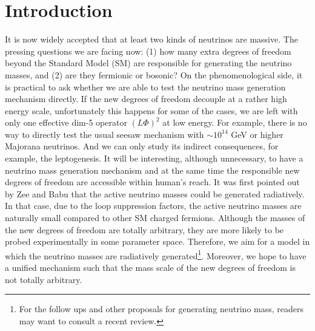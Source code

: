 \documentclass[aps,prd,preprint,nofootinbib]{revtex4}
\begin{document}
\section{Introduction}
It is now widely accepted that at least two kinds of neutrinos are
massive\cite{PDG}. The pressing questions we are facing now: (1)  how many extra degrees
of freedom beyond the Standard Model (SM) are responsible for
generating the neutrino masses, and (2) are they fermionic or bosonic?
On the phenomenological side, it is practical to ask whether we
are able to test the neutrino mass generation mechanism directly.
If the new degrees of freedom decouple at a rather high energy
scale, unfortunately this happens for some of the cases,  we are
left with only one effective dim-5 operator $(L \Phi)^2$ at  low
energy. For example, there is no way to directly test the usual
seesaw mechanism\cite{seesaw} with $\sim 10^{14}$ GeV or higher Majorana
neutrinos. And we can only study its indirect consequences, for
example, the leptogenesis.
It will be interesting, although unnecessary, to have a neutrino mass generation mechanism
 and at the same time
the responsible new degrees of freedom are accessible within
human's reach.  It was first pointed out by Zee and
Babu\cite{radi_nuM} that the active neutrino masses could be
generated radiatively. In that case, due to the loop suppression
factors, the active neutrino masses are naturally small compared
to other SM charged fermions. Although the masses of the new
degrees of freedom are  totally arbitrary, they are more likely to
be probed experimentally in some parameter space. Therefore, we
aim for a model in which the neutrino masses are radiatively
generated\footnote{ For the follow ups and other proposals for
generating neutrino mass, readers may want to consult a recent
review\cite{Chen:2011de}.  }. Moreover, we hope to have a unified
mechanism such that  the mass scale of the new degrees of freedom
is not totally arbitrary.
\end{document}
